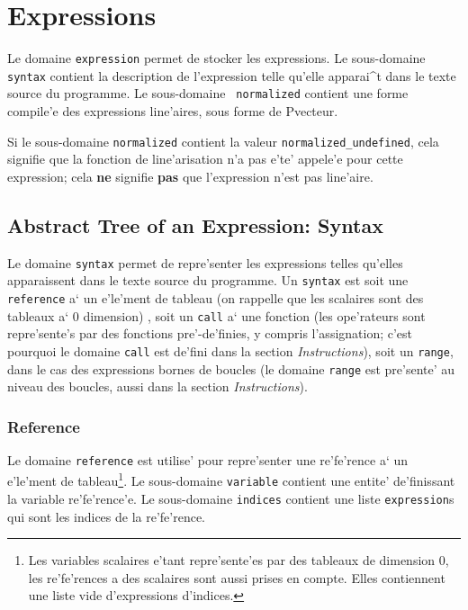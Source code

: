 \section{Expressions}
\label{expression}

{ 
Le domaine \verb/expression/ permet de stocker les expressions.  Le
sous-domaine {\tt syntax} contient la description de l'expression telle
qu'elle apparai^t dans le texte source du programme. Le sous-domaine {\tt
normalized} contient une forme compile'e des expressions line'aires,
sous forme de Pvecteur.

Si le sous-domaine {\tt normalized} contient la valeur
{\tt normalized\_undefined}, cela signifie que la fonction de line'arisation
n'a pas e'te' appele'e pour cette expression; cela {\bf ne} signifie
{\bf pas}
que l'expression n'est pas line'aire.
}

\subsection{Abstract Tree of an Expression: Syntax}
\label{subsection-syntax}

{
Le domaine \verb/syntax/ permet de repre'senter les expressions telles
qu'elles apparaissent dans le texte source du programme. Un
\verb/syntax/ est soit une \verb/reference/ a` un e'le'ment de tableau
(on rappelle que les scalaires sont des tableaux a` 0 dimension) , soit
un \verb/call/ a` une fonction (les ope'rateurs sont repre'sente's par
des fonctions pre'-de'finies, y compris l'assignation; c'est pourquoi le
domaine {\tt call} est de'fini dans la section {\em Instructions}), soit
un \verb/range/, dans le cas des expressions bornes de boucles (le domaine
{\tt range} est pre'sente' au niveau des boucles, aussi dans la section
{\em Instructions}).
}

\subsubsection{Reference}
\label{subsubsection-reference}

{
Le domaine \verb/reference/ est utilise' pour repre'senter une
re'fe'rence a` un e'le'ment de tableau\footnote{Les variables scalaires
e'tant repre'sente'es par des tableaux de dimension 0, les re'fe'rences
a des scalaires sont aussi prises en compte. Elles contiennent une liste
vide d'expressions d'indices.}.  Le sous-domaine \verb/variable/
contient une entite' de'finissant la variable re'fe'rence'e. Le
sous-domaine \verb/indices/ contient une liste {\tt expression}s qui sont les
indices de la re'fe'rence.
}

